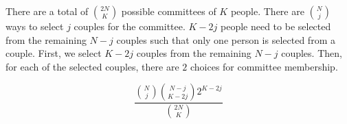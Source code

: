 There are a total of $\binom{2N}{K}$ possible committees of $K$ people. There are $\binom{N}{j}$ ways to select $j$ couples for the committee. $K-2j$ people need to be selected from the remaining $N-j$ couples such that only one person is selected from a couple. First, we select $K-2j$ couples from the remaining $N-j$ couples. Then, for each of the selected couples, there are $2$ choices for committee membership.

$$\frac{\binom{N}{j}\binom{N-j}{K-2j}2^{K-2j}}{\binom{2N}{K}}$$